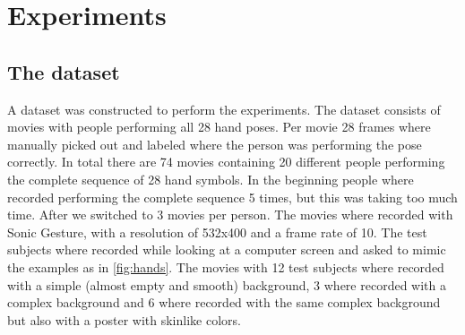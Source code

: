 
\chapter{Experiments}
\label{ch:experiments}


\section{The dataset}
A dataset was constructed to perform the experiments. The dataset consists of movies with people performing all 28 hand poses. Per movie 28 frames where manually picked out and labeled where the person was performing the pose correctly. In total there are 74 movies containing 20 different people performing the complete sequence of 28 hand symbols. In the beginning people where recorded performing the complete sequence 5 times, but this was taking too much time. After we switched to 3 movies per person. The movies where recorded with Sonic Gesture, with a resolution of 532x400 and a frame rate of 10. The test subjects where recorded while looking at a computer screen and asked to mimic the examples as in \autoref{fig:hands}. The movies with 12 test subjects where recorded with a simple (almost empty and smooth) background, 3 where recorded with a complex background and 6 where recorded with the same complex background but also with a poster with skinlike colors.



